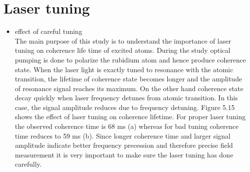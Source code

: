    \section{Laser tuning} 
   \begin{itemize}
   \item effect of careful tuning\\
	The main purpose of this study is to understand the importance of laser tuning on coherence life time of excited atoms. During the study optical pumping is done to polarize the rubidium atom and hence produce coherence state. When the laser light  is  exactly tuned to resonance with the atomic transition, the lifetime of coherence state becomes longer and the amplitude of resonance signal reaches its maximum. On the other hand coherence state decay  quickly when laser frequency detunes from atomic transition. In this case, the signal amplitude reduces due to frequency detuning. Figure 5.15 shows the effect of laser tuning on coherence lifetime. For proper laser tuning the observed coherence time is 68 ms (a) whereas for bad tuning coherence time reduces to 59 ms (b). Since  longer coherence time and larger signal amplitude indicate better frequency precession and therefore precise field measurement it is very important to make sure the laser tuning has done carefully.
   \begin{figure}
    \centering
 

\end{figure}
\end{itemize}
